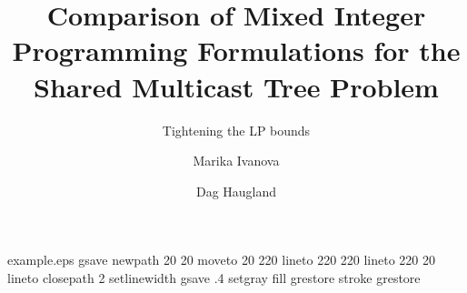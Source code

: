 %
%
%
%
%
\begin{filecontents*}{example.eps}
gsave
newpath
  20 20 moveto
  20 220 lineto
  220 220 lineto
  220 20 lineto
closepath
2 setlinewidth
gsave
  .4 setgray fill
grestore
stroke
grestore
\end{filecontents*}
%
\RequirePackage{fix-cm}
%
\documentclass[smallextended]{svjour3}       %
%
\smartqed  %
%
\usepackage{graphicx}
\usepackage{amsmath}
\usepackage{amsfonts}
\usepackage{caption}
\usepackage{subcaption}
\usepackage{hyperref}
\captionsetup{compatibility=false}
%
%
%
%
%


\title{Comparison of Mixed Integer Programming Formulations for the Shared Multicast Tree Problem%
}
\subtitle{Tightening the LP bounds}


\author{Marika Ivanova        \and
         Dag Haugland%
}


